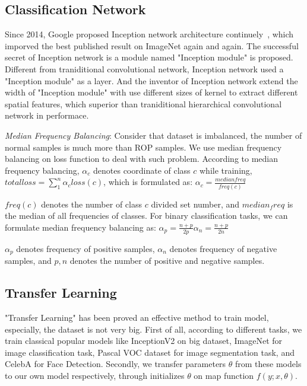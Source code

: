 \documentclass[10pt,twocolumn,letterpaper]{article}
\begin{document}
\subsection{Classification Network}
  Since 2014, Google proposed Inception network architecture continuely~\cite{03, 04, 05, 06}, which imporved the best published result on ImageNet again and again. The successful secret of Inception network is a module named "Inception module" is proposed. Different from traniditional convolutional network, Inception network used a "Inception module"  as a layer. And the inventor of Inception network extend the width of "Inception module" with use different sizes of kernel to extract different spatial features, which superior than traniditional hierarchical convolutional network in performace.

  \emph{Median Frequency Balancing}: Consider that dataset is imbalanced, the number of normal samples is much more than ROP samples. We use median frequency balancing on loss function to deal with such problem. According to median frequency balancing, ${\alpha}_c$ denotes coordinate of class $c$ while training, \eg $ total loss = \sum_1^{n} {{{\alpha}_c} \dot loss(c)}$, which is formulated as:
  \begin{math}
    {\alpha}_c = \frac{median freq}{freq(c)}
  \end{math}

  $freq(c)$ denotes the number of class $c$ divided set number, and $median_freq$ is the median of all frequencies of classes. For binary classification tasks, we can formulate median frequency balancing as:
  \begin{math}
    {\alpha}_p = \frac{n + p}{2 \dot p}
    {\alpha}_n = \frac{n + p}{2 \dot n}
  \end{math}

  ${\alpha}_p$ denotes frequency of positive samples, ${\alpha}_n$ denotes frequency of negative samples, and $p, n$ denotes the number of positive and negative samples.

\subsection{Transfer Learning}
    "Transfer Learning" has been proved an effective method to train model, especially, the dataset is not very big. First of all, according to different tasks, we train classical popular models like InceptionV2 on big dataset, \eg ImageNet for image classification task, Pascal VOC dataset for image segmentation task, and CelebA for Face Detection. Secondly, we transfer parameters $\theta$ from these models to our own model respectively, through initializes $\theta$ on map function $f(y;x, \theta)$.
\end{document}
